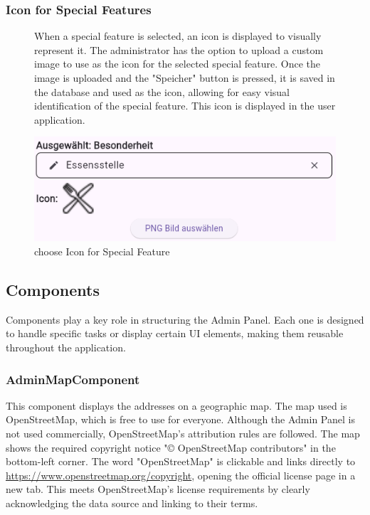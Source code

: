 \subsubsection{Icon for Special Features}
\begin{figure}[H] 
    \begin{minipage}{0.6\textwidth}
        When a special feature is selected, an icon is displayed to visually represent it. The administrator has the option to upload a custom image to use as the icon for the selected special feature. Once the image is uploaded and the "Speicher" button is pressed, it is saved in the database and used as the icon, allowing for easy visual identification of the special feature. This icon is displayed in the user application.
    \end{minipage}
    \hfill
    \begin{minipage}{0.35\textwidth}
        \centering
        \includegraphics[width=\linewidth]{images/AdminPanel/chooseIcon.png}
        \caption{choose Icon for Special Feature}
    \end{minipage}
\end{figure}

\newpage

\subsection{Components}
Components play a key role in structuring the Admin Panel. Each one is designed to handle specific tasks or display certain UI elements, making them reusable throughout the application. 
\subsubsection{AdminMapComponent}
\label{fig:AdminMapComponent}
This component displays the addresses on a geographic map. The map used is OpenStreetMap, which is free to use for everyone. Although the Admin Panel is not used commercially, OpenStreetMap's attribution rules are followed. The map shows the required copyright notice "© OpenStreetMap contributors" in the bottom-left corner. The word "OpenStreetMap" is clickable and links directly to \url{https://www.openstreetmap.org/copyright}, opening the official license page in a new tab. This meets OpenStreetMap's license requirements by clearly acknowledging the data source and linking to their terms. \autocite{OpenStreetMap}


